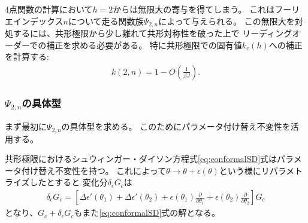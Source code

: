 4点関数の計算において$h = 2$からは無限大の寄与を得てしまう。
これはフーリエインデックス$n$について走る関数族$\Psi_{2,n}$によって与えられる。
この無限大を対処するには、共形極限から少し離れて共形対称性を破った上で
リーディングオーダーでの補正を求める必要がある。
特に共形極限での固有値$k_c(h)$への補正を計算する:
\begin{align}
	k(2, n) = 1 - O\left(\frac{1}{\beta J}\right).
\end{align}

\subsubsection{$\Psi_{2,n}$の具体型}
まず最初に$\Psi_{2,n}$の具体型を求める。
このためにパラメータ付け替え不変性を活用する。

共形極限におけるシュウィンガー・ダイソン方程式\eqref{eq:conformalSD}式はパラメータ付け替え不変性を持つ。
これによって$\theta\to\theta + \epsilon(\theta)$という様にリパラメトライズしたとすると
変化分$\delta_{\epsilon}G_c$は
\begin{align}
	\delta_{\epsilon}G_c
	= \left[\Delta\epsilon'(\theta_1) + \Delta\epsilon'(\theta_2)
		+ \epsilon(\theta_1)\frac{\partial}{\partial{\theta_1}}
		+ \epsilon(\theta_2)\frac{\partial}{\partial{\theta_2}}
	\right]G_c
	\label{eq:reparameterization_fomula}
\end{align}
となり、$G_c + \delta_{\epsilon}G_c$もまた\eqref{eq:conformalSD}式の解となる。
